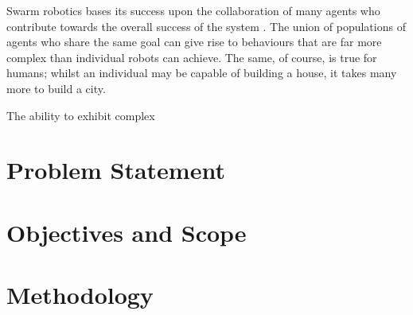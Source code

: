 \documentclass[.../main.tex]{subfiles}
\begin{document}
    Swarm robotics bases its success upon the collaboration of many agents who contribute towards
    the overall success of the system \cite{HammanFormalApproach}. The union of populations of
    agents who share the same goal can give rise to behaviours that are far more complex than
    individual robots can achieve. The same, of course, is true for humans; whilst an individual may
    be capable of building a house, it takes many more to build a city.

    The ability to exhibit complex 
    
    \section{Problem Statement} \label{sec::Problem_Statement}

    \section{Objectives and Scope} \label{sec::Objectives_and_Scope}

    \section{Methodology} \label{sec::Methodology}
\end{document}

